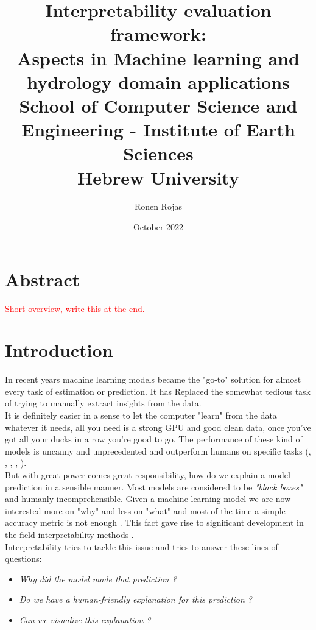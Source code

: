 \documentclass[12pt]{report}
\title{
	{Interpretability evaluation framework: \\ Aspects in Machine learning and hydrology domain applications}\\
	{\large School of Computer Science and Engineering - 
		Institute of Earth Sciences}\\
	{\large Hebrew University}
}
\author{Ronen Rojas}
\date{October 2022}
\begin{document}
\maketitle
\tableofcontents
\newpage

\chapter{Abstract} 

\textcolor{red}{Short overview, write this at the end.}



\newpage
\chapter{Introduction} 

In recent years machine learning models became the "go-to" solution for almost every task of estimation or prediction. It has Replaced the somewhat tedious task of trying to manually extract insights from the data.\\

It is definitely easier in a sense to let the computer "learn" from the data whatever it needs, all you need is a strong GPU and good clean data, once you've got all your ducks in a row you're good to go. The performance of these kind of models is uncanny and unprecedented and outperform humans on specific tasks (\cite{he2015deep}, \cite{DBLP:journals/corr/abs-1805-01890}, \cite{DBLP:journals/corr/abs-1905-01392}, \cite{DBLP:journals/corr/MnihKSGAWR13}, \cite{Silver_2016}).\\

But with great power comes great responsibility, how do we explain a model prediction in a sensible manner. Most models are considered to be \textit{"black boxes"} and humanly incomprehensible. Given a machine learning model we are now interested more on "why" and less on "what" and most of the time a simple accuracy metric is not enough . This fact gave rise to significant development in the field interpretability methods 
\cite{molnar2019}. \\

Interpretability tries to tackle this issue and tries to answer these lines of questions:
\begin{itemize}
	\item \textit{Why did the model made that prediction ?}	
	\item \textit{Do we have a human-friendly explanation for this prediction ?}	
	\item \textit{Can we visualize this explanation ? }	
\end{itemize}
\end{document}

